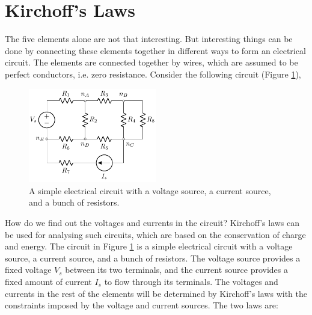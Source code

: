 \section{Kirchoff's Laws}
The five elements alone are not that interesting. But interesting things can be done by connecting these elements together in different ways to form an electrical circuit. The elements are connected together by wires, which are assumed to be perfect conductors, i.e. zero resistance. Consider the following circuit (Figure \ref{fig:02-02}),
\begin{figure}[t]
    \centering
    \includegraphics[width=0.5\textwidth]{figure/ch02/fig02-02.pdf}
    \caption{A simple electrical circuit with a voltage source, a current source, and a bunch of resistors.}
    \label{fig:02-02}
\end{figure}

How do we find out the voltages and currents in the circuit? Kirchoff's laws can be used for analysing such circuits, which are based on the conservation of charge and energy. The circuit in Figure \ref{fig:02-02} is a simple electrical circuit with a voltage source, a current source, and a bunch of resistors. The voltage source provides a fixed voltage $V_s$ between its two terminals, and the current source provides a fixed amount of current $I_s$ to flow through its terminals. The voltages and currents in the rest of the elements will be determined by Kirchoff's laws with the constraints imposed by the voltage and current sources. The two laws are:

